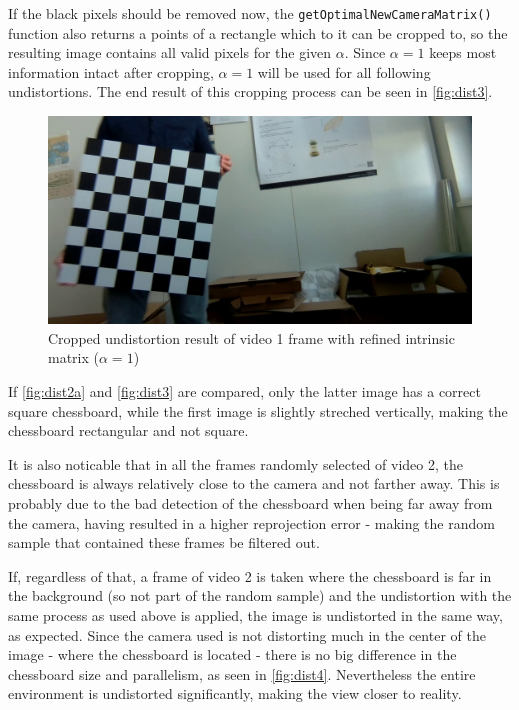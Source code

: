 If the black pixels should be removed now, the \texttt{getOptimalNewCameraMatrix()} function also returns a points of a rectangle which to it can be cropped to, so the resulting image contains all valid pixels for the given $\alpha$. Since $\alpha = 1$ keeps most information intact after cropping, $\alpha = 1$ will be used for all following undistortions. The end result of this cropping process can be seen in \autoref{fig:dist3}.

\begin{figure}[h]
    \centering
    \includegraphics[width=\textwidth]{figures/img1_5.jpg}
    \caption{Cropped undistortion result of video 1 frame with refined intrinsic matrix ($\alpha = 1$)}
    \label{fig:dist3}
\end{figure}

If \autoref{fig:dist2a} and \autoref{fig:dist3} are compared, only the latter image has a correct square chessboard, while the first image is slightly streched vertically, making the chessboard rectangular and not square.

It is also noticable that in all the frames randomly selected of video 2, the chessboard is always relatively close to the camera and not farther away. This is probably due to the bad detection of the chessboard when being far away from the camera, having resulted in a higher reprojection error - making the random sample that contained these frames be filtered out.

If, regardless of that, a frame of video 2 is taken where the chessboard is far in the background (so not part of the random sample) and the undistortion with the same process as used above is applied, the image is undistorted in the same way, as expected. Since the camera used is not distorting much in the center of the image - where the chessboard is located - there is no big difference in the chessboard size and parallelism, as seen in \autoref{fig:dist4}. Nevertheless the entire environment is undistorted significantly, making the view closer to reality.

